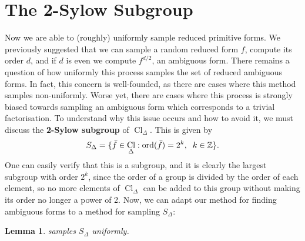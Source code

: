 \documentclass[honours,12pt]{unswthesis}
\newcommand{\Z}{\mathbb{Z}} %
\DeclareMathOperator{\Cl}{Cl}
\newcommand{\divides}{\mathrel{|}}
\newcommand{\algosep}{
    \vspace{1mm}
    \par
    \nointerlineskip
    \moveleft\algomargin\vbox{\hrule width \columnwidth}
    \nointerlineskip
    \vspace{1mm}
}
\newtheorem{lemma}[theorem]{Lemma}
\numberwithin{equation}{section}
\begin{document}
\section{The 2-Sylow Subgroup}
Now we are able to (roughly) uniformly sample reduced primitive forms.
We previously suggested that we can sample a random reduced form $f$, compute its order $d$, and if $d$ is even we compute $f^{d/2}$, an ambiguous form.
There remains a question of how uniformly this process samples the set of reduced ambiguous forms.
In fact, this concern is well-founded, as there are cases where this method samples non-uniformly.
Worse yet, there are cases where this process is strongly biased towards sampling an ambiguous form which corresponds to a trivial factorisation.
To understand why this issue occurs and how to avoid it, we must discuss the \textbf{2-Sylow subgroup} of $\Cl_\Delta$.
This is given by
$$S_\Delta = \{ \bar{f} \in \Cl_\Delta : \text{ord}({\bar{f}}) = 2^k, \hspace{2mm} k \in \Z \}.$$
One can easily verify that this is a subgroup, and it is clearly the largest subgroup with order $2^k$, since the order of a group is divided by the order of each element, so no more elements of $\Cl_\Delta$ can be added to this group without making its order no longer a power of 2.
Now, we can adapt our method for finding ambiguous forms to a method for sampling $S_\Delta$:

\begin{lemma}
     samples $S_\Delta$ uniformly.
\end{lemma}
\end{document}
